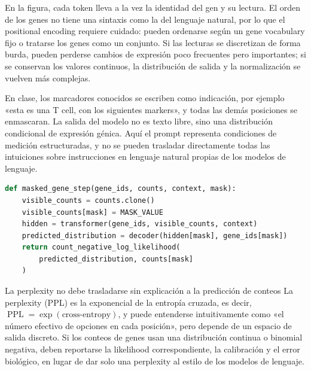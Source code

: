 En la figura, cada token lleva a la vez la identidad del gen y su lectura. El orden de los genes no tiene una sintaxis como la del lenguaje natural, por lo que el positional encoding requiere cuidado: pueden ordenarse según un gene vocabulary fijo o tratarse los genes como un conjunto. Si las lecturas se discretizan de forma burda, pueden perderse cambios de expresión poco frecuentes pero importantes; si se conservan los valores continuos, la distribución de salida y la normalización se vuelven más complejas.


En clase, los marcadores conocidos se escriben como indicación, por ejemplo «esta es una T cell, con los siguientes markers», y todas las demás posiciones se enmascaran. La salida del modelo no es texto libre, sino una distribución condicional de expresión génica. Aquí el prompt representa condiciones de medición estructuradas, y no se pueden trasladar directamente todas las intuiciones sobre instrucciones en lenguaje natural propias de los modelos de lenguaje.

\begin{lstlisting}[language=Python,caption={Modelado de genes enmascarados: la señal de supervisión se calcula solo en las posiciones ocultas}]
def masked_gene_step(gene_ids, counts, context, mask):
    visible_counts = counts.clone()
    visible_counts[mask] = MASK_VALUE
    hidden = transformer(gene_ids, visible_counts, context)
    predicted_distribution = decoder(hidden[mask], gene_ids[mask])
    return count_negative_log_likelihood(
        predicted_distribution, counts[mask]
    )
\end{lstlisting}

\begin{warningbox}{La perplexity no debe trasladarse sin explicación a la predicción de conteos}
La perplexity (PPL) es la exponencial de la entropía cruzada, es decir, $\operatorname{PPL}=\exp(\text{cross-entropy})$, y puede entenderse intuitivamente como «el número efectivo de opciones en cada posición», pero depende de un espacio de salida discreto. Si los conteos de genes usan una distribución continua o binomial negativa, deben reportarse la likelihood correspondiente, la calibración y el error biológico, en lugar de dar solo una perplexity al estilo de los modelos de lenguaje.
\end{warningbox}

